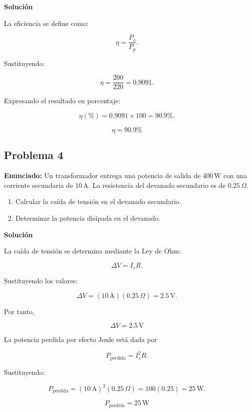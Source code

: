 \textbf{Solución}

La eficiencia se define como:

\begin{equation}
\eta=\frac{P_s}{P_p}.
\end{equation}

Sustituyendo:

\begin{equation}
\eta=\frac{200}{220}=0.9091.
\end{equation}

Expresando el resultado en porcentaje:

\begin{equation}
\eta(\%)=0.9091\times100=90.9\%.
\end{equation}

\begin{equation}
\boxed{\eta = 90.9\%}
\end{equation}

\subsection{Problema 4}

\textbf{Enunciado:} Un transformador entrega una potencia de salida de $400\,\mathrm{W}$ con una corriente secundaria de $10\,\mathrm{A}$. La resistencia del devanado secundario es de $0.25\,\Omega$.

\begin{enumerate}
    \item Calcular la caída de tensión en el devanado secundario.
    \item Determinar la potencia disipada en el devanado.
\end{enumerate}

\textbf{Solución}

La caída de tensión se determina mediante la Ley de Ohm:

\begin{equation}
\Delta V = I_sR.
\end{equation}

Sustituyendo los valores:

\begin{equation}
\Delta V=(10\,\mathrm{A})(0.25\,\Omega)
=2.5\,\mathrm{V}.
\end{equation}

Por tanto,

\begin{equation}
\boxed{\Delta V = 2.5\,\mathrm{V}}
\end{equation}

La potencia perdida por efecto Joule está dada por

\begin{equation}
P_{\text{perdida}}=I_s^2R.
\end{equation}

Sustituyendo:

\begin{equation}
P_{\text{perdida}}
=(10\,\mathrm{A})^2(0.25\,\Omega)
=100(0.25)
=25\,\mathrm{W}.
\end{equation}

\begin{equation}
\boxed{P_{\text{perdida}} = 25\,\mathrm{W}}
\end{equation}
\nocite{*}